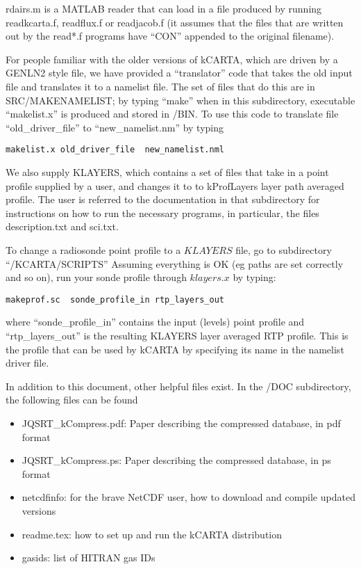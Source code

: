 \documentclass[12pt]{article}
\newcommand{\kc}{\textsf{kCARTA}\xspace}
\begin{document}
{{{{{\sf rdairs.m} is a {\sf MATLAB}
reader that can load in a file produced by running readkcarta.f, readflux.f  or
readjacob.f (it assumes that the files that are written out by the
read*.f programs have ``CON'' appended to the original filename).

For people familiar with the older versions of \kc, which are driven by a 
GENLN2 style file, we have provided a ``translator'' code  that takes the
old input file and translates it to a namelist file. The set of files
that do this are in SRC/MAKENAMELIST; by typing ``make'' when in this
subdirectory, executable ``makelist.x'' is produced and stored in /BIN.
To use this code to translate file ``old\_driver\_file'' to 
``new\_namelist.nm'' by typing \\
\begin{verbatim}
makelist.x old_driver_file  new_namelist.nml
\end{verbatim}

We also supply KLAYERS, which contains a set of files that take in a
point profile supplied by a user, and changes it to to kProfLayers layer path
averaged profile.  The user is referred to the documentation in that
subdirectory for instructions on how to run the necessary programs, in
particular, the files description.txt and sci.txt.

\noindent To change a radiosonde point profile to a $KLAYERS$ file, go to
subdirectory ``/KCARTA/SCRIPTS'' Assuming everything is OK (eg paths are set
correctly and so on), run your sonde profile through $klayers.x$ by typing: 
\begin{verbatim}
makeprof.sc  sonde_profile_in rtp_layers_out
\end{verbatim}
where ``sonde\_profile\_in'' contains the input (levels) point profile and 
``rtp\_layers\_out'' is the resulting KLAYERS layer averaged RTP profile. This
is the profile that can be used by \kc by specifying its name in the namelist
driver file.

In addition to this document, other helpful files exist.  In the /DOC 
subdirectory, the following files can be found
\begin{itemize}
\item {\sf JQSRT\_kCompress.pdf}: Paper describing the compressed database,
  in pdf format
\item {\sf JQSRT\_kCompress.ps}: Paper describing the compressed database,
  in ps format
\item {\sf netcdfinfo}: for the brave NetCDF user, how to download and
  compile updated versions
\item {\sf readme.tex}: how to set up and run the \kc distribution 
\item {\sf gasids}: list of {\sf HITRAN} gas IDs
\end{itemize}

}}}}
\end{document}
